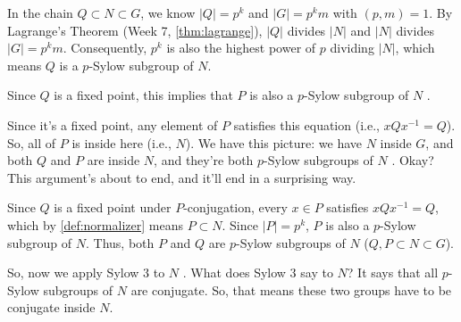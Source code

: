 \begin{proofWrapper}
\begin{content}
In the chain $Q \subset N \subset G$, we know $|Q| = p^k$ and $|G| = p^k m$ with $(p, m) = 1$. By Lagrange's Theorem (Week 7, \cref{thm:lagrange}), $|Q|$ divides $|N|$ and $|N|$ divides $|G| = p^k m$. Consequently, $p^k$ is also the highest power of $p$ dividing $|N|$, which means $Q$ is a $p$-Sylow subgroup of $N$.
\end{content}

\begin{hidden}
\end{hidden}

\begin{speech}[00:13:08 - 00:13:50]
Since $Q$ is a fixed point, this implies that $P$ is also a $p$-Sylow subgroup of $N$ .

Since it's a fixed point, any element of $P$ satisfies this equation (i.e., $x Q x^{-1} = Q$). So, all of $P$ is inside here (i.e., $N$). We have this picture: we have $N$ inside $G$, and both $Q$ and $P$ are inside $N$, and they're both $p$-Sylow subgroups of $N$ . Okay? This argument's about to end, and it'll end in a surprising way.
\end{speech}

\begin{content}
Since $Q$ is a fixed point under $P$-conjugation, every $x \in P$ satisfies $x Q x^{-1} = Q$, which by \cref{def:normalizer} means $P \subset N$. Since $|P| = p^k$, $P$ is also a $p$-Sylow subgroup of $N$. Thus, both $P$ and $Q$ are $p$-Sylow subgroups of $N$ ($Q, P \subset N \subset G$).
\end{content}

\begin{speech}[00:13:50 - 00:14:47]
So, now we apply Sylow $3$ to $N$ . What does Sylow $3$ say to $N$? It says that all $p$-Sylow subgroups of $N$ are conjugate. So, that means these two groups have to be conjugate inside $N$.


\end{speech}
\end{proofWrapper}

